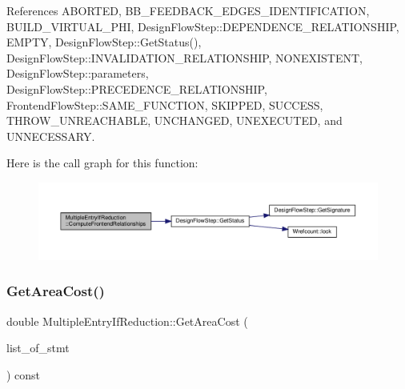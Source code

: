 References A\+B\+O\+R\+T\+ED, B\+B\+\_\+\+F\+E\+E\+D\+B\+A\+C\+K\+\_\+\+E\+D\+G\+E\+S\+\_\+\+I\+D\+E\+N\+T\+I\+F\+I\+C\+A\+T\+I\+ON, B\+U\+I\+L\+D\+\_\+\+V\+I\+R\+T\+U\+A\+L\+\_\+\+P\+HI, Design\+Flow\+Step\+::\+D\+E\+P\+E\+N\+D\+E\+N\+C\+E\+\_\+\+R\+E\+L\+A\+T\+I\+O\+N\+S\+H\+IP, E\+M\+P\+TY, Design\+Flow\+Step\+::\+Get\+Status(), Design\+Flow\+Step\+::\+I\+N\+V\+A\+L\+I\+D\+A\+T\+I\+O\+N\+\_\+\+R\+E\+L\+A\+T\+I\+O\+N\+S\+H\+IP, N\+O\+N\+E\+X\+I\+S\+T\+E\+NT, Design\+Flow\+Step\+::parameters, Design\+Flow\+Step\+::\+P\+R\+E\+C\+E\+D\+E\+N\+C\+E\+\_\+\+R\+E\+L\+A\+T\+I\+O\+N\+S\+H\+IP, Frontend\+Flow\+Step\+::\+S\+A\+M\+E\+\_\+\+F\+U\+N\+C\+T\+I\+ON, S\+K\+I\+P\+P\+ED, S\+U\+C\+C\+E\+SS, T\+H\+R\+O\+W\+\_\+\+U\+N\+R\+E\+A\+C\+H\+A\+B\+LE, U\+N\+C\+H\+A\+N\+G\+ED, U\+N\+E\+X\+E\+C\+U\+T\+ED, and U\+N\+N\+E\+C\+E\+S\+S\+A\+RY.

Here is the call graph for this function\+:
\nopagebreak
\begin{figure}[H]
\begin{center}
\leavevmode
\includegraphics[width=350pt]{d3/d5a/classMultipleEntryIfReduction_a14ca1aca808b8519a8504ac06cf11cc6_cgraph}
\end{center}
\end{figure}
\mbox{\label{classMultipleEntryIfReduction_ac6f3dc9035b0d68e3130655939dc1d16}} 
\subsubsection{\texorpdfstring{Get\+Area\+Cost()}{GetAreaCost()}}
{\footnotesize\ttfamily double Multiple\+Entry\+If\+Reduction\+::\+Get\+Area\+Cost (\begin{DoxyParamCaption}\item[{const std\+::list$<$ \hyperlink{tree__node_8hpp_a6ee377554d1c4871ad66a337eaa67fd5}{tree\+\_\+node\+Ref} $>$ \&}]{list\+\_\+of\+\_\+stmt }\end{DoxyParamCaption}) const\hspace{0.3cm}{\ttfamily [private]}}



